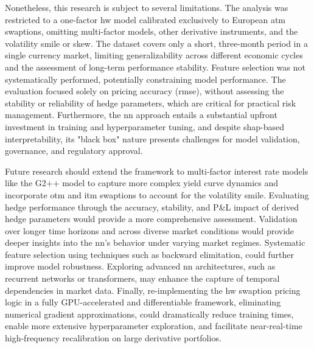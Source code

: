 Nonetheless, this research is subject to several limitations. The analysis was restricted to a one-factor \ac{hw} model calibrated exclusively to European \ac{atm} swaptions, omitting multi-factor models, other derivative instruments, and the volatility smile or skew. The dataset covers only a short, three-month period in a single currency market, limiting generalizability across different economic cycles and the assessment of long-term performance stability. Feature selection was not systematically performed, potentially constraining model performance. The evaluation focused solely on pricing accuracy (\ac{rmse}), without assessing the stability or reliability of hedge parameters, which are critical for practical risk management. Furthermore, the \ac{nn} approach entails a substantial upfront investment in training and hyperparameter tuning, and despite \ac{shap}-based interpretability, its "black box" nature presents challenges for model validation, governance, and regulatory approval.  

Future research should extend the framework to multi-factor interest rate models like the G2++ model to capture more complex yield curve dynamics and incorporate \ac{otm} and \ac{itm} swaptions to account for the volatility smile. Evaluating hedge performance through the accuracy, stability, and P\&L impact of derived hedge parameters would provide a more comprehensive assessment. Validation over longer time horizons and across diverse market conditions would provide deeper insights into the \ac{nn}'s behavior under varying market regimes. Systematic feature selection using techniques such as backward elimitation, could further improve model robustness. Exploring advanced \ac{nn} architectures, such as recurrent networks or transformers, may enhance the capture of temporal dependencies in market data. Finally, re-implementing the \ac{hw} swaption pricing logic in a fully GPU-accelerated and differentiable framework, eliminating numerical gradient approximations, could dramatically reduce training times, enable more extensive hyperparameter exploration, and facilitate near-real-time high-frequency recalibration on large derivative portfolios.
